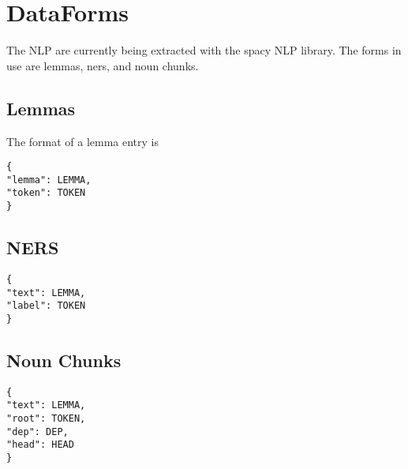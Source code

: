 \documentclass{article}
\begin{document}
\section{DataForms}
The NLP are currently being extracted with the spacy NLP library. The forms in use are lemmas, ners, and noun chunks.

\subsection{Lemmas}
The format of a lemma entry is 

\begin{lstlisting}
{
"lemma": LEMMA,
"token": TOKEN
}
\end{lstlisting}

\subsection{NERS}
\begin{lstlisting}
{
"text": LEMMA,
"label": TOKEN
}
\end{lstlisting}

\subsection{Noun Chunks}
\begin{lstlisting}
{
"text": LEMMA,
"root": TOKEN,
"dep": DEP,
"head": HEAD
}
\end{lstlisting}
\end{document}
